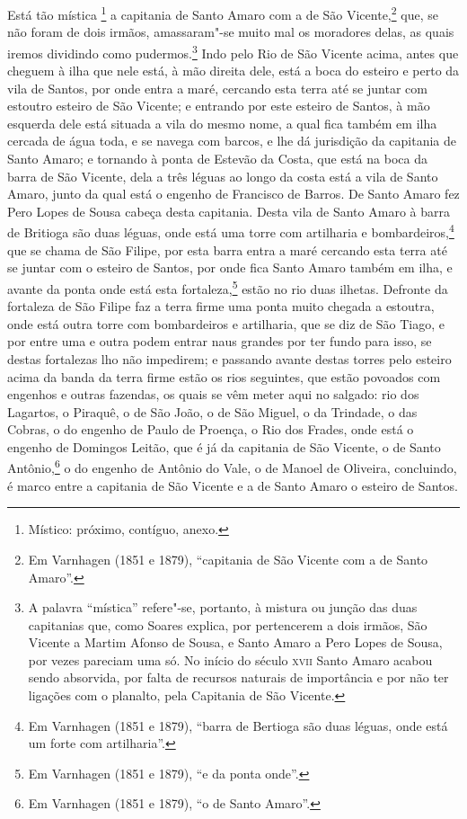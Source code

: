 Está tão mística \footnote{ Místico: próximo, contíguo, anexo.} a capitania de Santo Amaro
com a de São Vicente,\footnote{ Em Varnhagen (1851 e 1879), ``capitania de São Vicente com
a de Santo Amaro''.} que, se não foram de dois irmãos, amassaram"-se muito mal os moradores
delas, as quais iremos dividindo como pudermos.\footnote{ A palavra ``mística'' refere"-se,
portanto, à mistura ou junção das duas capitanias que, como Soares explica, por
pertencerem a dois irmãos, São Vicente a Martim Afonso de Sousa, e Santo Amaro a Pero Lopes
de Sousa, por vezes pareciam uma só. No início do século \textsc{xvii} Santo Amaro acabou
sendo absorvida, por falta de recursos naturais de importância e por não ter ligações com
o planalto, pela Capitania de São Vicente.} Indo pelo Rio de São Vicente acima, antes que
cheguem à ilha que nele está, à mão direita dele, está a boca do esteiro e perto da vila
de Santos, por onde entra a maré, cercando esta terra até se juntar com estoutro esteiro
de São Vicente; e entrando por este esteiro de Santos, à mão esquerda dele está situada a
vila do mesmo nome, a qual fica também em ilha cercada de água toda, e se navega com
barcos, e lhe dá jurisdição da capitania de Santo Amaro; e tornando à ponta de Estevão da
Costa, que está na boca da barra de São Vicente, dela a três léguas ao longo da costa está
a vila de Santo Amaro, junto da qual está o engenho de Francisco de Barros. De Santo Amaro
fez Pero Lopes de Sousa cabeça desta capitania. Desta vila de Santo Amaro à barra de
Britioga são duas léguas, onde está uma torre com artilharia e bombardeiros,\footnote{ Em
Varnhagen (1851 e 1879), ``barra de Bertioga são duas léguas, onde está um forte com
artilharia''.} que se chama de São Filipe, por esta barra entra a maré cercando esta terra
até se juntar com o esteiro de Santos, por onde fica Santo Amaro também em ilha, e avante
da ponta onde está esta fortaleza,\footnote{ Em Varnhagen (1851 e 1879), ``e da ponta
onde''.} estão no rio duas ilhetas. Defronte da fortaleza de São Filipe faz a terra firme
uma ponta muito chegada a estoutra, onde está outra torre com bombardeiros e artilharia,
que se diz de São Tiago, e por entre uma e outra podem entrar naus grandes por ter fundo
para isso, se destas fortalezas lho não impedirem; e passando avante destas torres pelo
esteiro acima da banda da terra firme estão os rios seguintes, que estão povoados com
engenhos e outras fazendas, os quais se vêm meter aqui no salgado: rio dos Lagartos, o
Piraquê, o de São João, o de São Miguel, o da Trindade, o das Cobras, o do engenho de
Paulo de Proença, o Rio dos Frades, onde está o engenho de Domingos Leitão, que é já da
capitania de São Vicente, o de Santo Antônio,\footnote{ Em Varnhagen (1851 e 1879), ``o de
Santo Amaro''.} o do engenho de Antônio do Vale, o de Manoel de Oliveira, concluindo, é
marco entre a capitania de São Vicente e a de Santo Amaro o esteiro de Santos.

